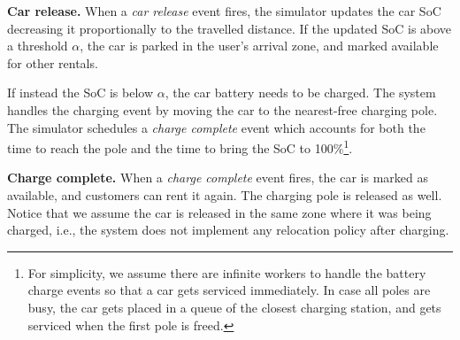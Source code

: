 \textbf{Car release.}
When a \emph{car release} event fires, the simulator updates the car SoC decreasing it proportionally to the travelled distance.
If the updated SoC is above a threshold $\alpha$, the car is parked in the user's arrival zone, and marked available for other rentals.

If instead the SoC is below $\alpha$, the car battery needs to be charged. The system handles the charging event by moving the car to the nearest-free charging pole. The simulator schedules a \emph{charge complete} event which accounts for both the time to reach the pole and the time to bring the SoC to 100\%\footnote{For simplicity, we assume there are infinite workers to handle the battery charge events so that a car gets serviced immediately. In case all poles are busy, the car gets placed in a queue of the closest charging station, and gets serviced when the first pole is freed.}.





\textbf{Charge complete.} When a \emph{charge complete} event fires, the car is marked as available, and customers can rent it again. The charging pole is released as well.  
Notice that we assume the car is released in the same zone where it was being charged, i.e., the system does not implement any relocation policy after charging.


